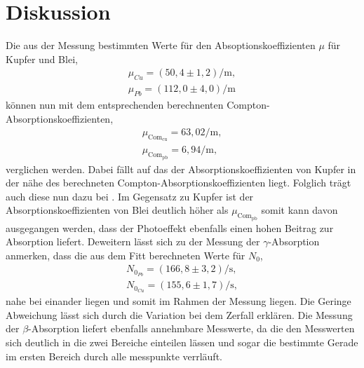 \newpage
\section{Diskussion}
\label{sec:Diskussion}
Die aus der Messung bestimmten Werte für den Absoptionskoeffizienten $\mu$
für Kupfer und Blei,
\begin{align*}
\mu_{Cu}=(50,4\pm1,2)\si{\per\meter},\\
\mu_{Pb}=(112,0\pm4,0)\si{\per\meter}
\end{align*}
können nun mit dem entsprechenden berechnenten Compton-Absorptionskoeffizienten,
\begin{align*}
  \mu_\mathrm{Com_{cu}}={63,02\si{\per\meter}},\\
  \mu_\mathrm{Com_{pb}}={6,94\si{\per\meter}},
\end{align*}
verglichen werden.
Dabei fällt auf das der Absorptionskoeffizienten von Kupfer
in der nähe des berechneten Compton-Absorptionskoeffizienten liegt.
Folglich trägt auch diese nun dazu bei .
Im Gegensatz zu Kupfer ist der Absorptionskoeffizienten von Blei deutlich höher
als $\mu_\mathrm{Com_{pb}}$ somit kann davon ausgegangen werden, dass der
Photoeffekt ebenfalls einen hohen Beitrag zur Absorption liefert.
Deweitern lässt sich zu der Messung der $\gamma$-Absorption anmerken, dass
die aus dem Fitt berechneten Werte für $N_0$,
\begin{align*}
  N_{0_{Pb}}=(166,8\pm3,2)\si{\per\second},\\
  N_{0_{Cu}}=(155,6\pm1,7)\si{\per\second},
\end{align*}
nahe bei einander liegen und somit im Rahmen der Messung liegen. Die Geringe Abweichung lässt
sich durch die Variation bei dem Zerfall erklären.
Die Messung der $\beta$-Absorption liefert ebenfalls annehmbare Messwerte, da
die den Messwerten sich deutlich in die zwei Bereiche einteilen lässen
und sogar die bestimmte Gerade im ersten Bereich durch alle messpunkte verrläuft.

